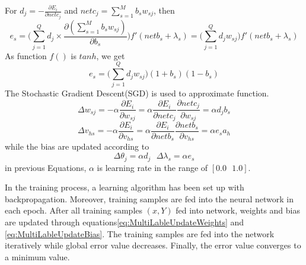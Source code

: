 For $d_{j} = - \frac{\partial E_{i}}{\partial netc_{j}}$ and $netc_{j} = \sum_{s=1}^M b_{s}w_{sj}$, then 
\begin{equation}\label{eq:MultiLableGenErrEs}
e_{s} = \big( \sum_{j=1}^Q d_{j} \times \frac{\partial (\sum_{s=1}^M b_{s}w_{sj})}{\partial b_{s}}\big) f'(netb_{s} + \lambda_{s}) = \big( \sum_{j=1}^Q d_{j}w_{sj}\big) f'(netb_{s} + \lambda_{s})
\end{equation}
As function $f()$ is $tanh$, we get
\begin{equation}\label{eq:MultiLableGenErrEsFin}
e_{s} = \big( \sum_{j=1}^Q d_{j}w_{sj}\big) (1+b_{s})(1-b_{s})
\end{equation}
The Stochastic Gradient Descent(SGD) is used to approximate function.
\begin{equation}\label{eq:MultiLableUpdateWeights}
\Delta w_{sj} = -\alpha \frac{\partial E_{i}}{\partial w_{sj}} = \alpha \frac{\partial E_{i}}{\partial netc_{j}} \frac{\partial netc_{j}}{\partial w_{sj}} = \alpha d_{j}b_{s}
\end{equation}
\begin{equation}\label{eq:MultiLableUpdateHidWeights}
\Delta v_{hs} = -\alpha \frac{\partial E_{i}}{\partial v_{hs}} = \alpha \frac{\partial E_{i}}{\partial netb_{s}} \frac{\partial netb_{s}}{\partial v_{hs}} = \alpha e_{s}a_{h}
\end{equation}
while the bias are updated according to
\begin{equation}\label{eq:MultiLableUpdateBias}
\Delta \theta_{j} = \alpha d_{j} \text{ } \Delta \lambda_{s} = \alpha e_{s}
\end{equation}
in previous Equations, $\alpha$ is learning rate in the range of $[0.0 \text{ } 1.0]$.

In the training process, a learning algorithm has been set up with backpropagation. Moreover, training samples are fed into the neural network in each epoch. After all training samples $(x, Y)$ fed into network, weights and bias are updated through equations\ref{eq:MultiLableUpdateWeights} and \ref{eq:MultiLableUpdateBias}. The training samples are fed into the network iteratively while global error value decreases. Finally, the error value converges to a minimum value.

